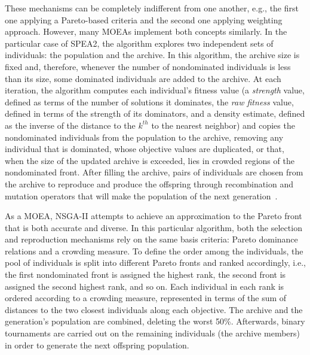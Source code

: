 	These mechanisms can be completely indifferent from one another, e.g., the first one applying a Pareto-based criteria and the second one applying weighting approach. However, many \acp{MOEA} implement both concepts similarly. In the particular case of \ac{SPEA2}, the algorithm explores two independent sets of individuals: the population and the archive. In this algorithm, the archive size is fixed and, therefore, whenever the number of nondominated individuals is less than its size, some dominated individuals are added to the archive. At each iteration, the algorithm computes each individual's fitness value (a \textit{strength} value, defined as terms of the number of solutions it dominates, the \textit{raw fitness} value, defined in terms of the strength of its dominators, and a density estimate, defined as the inverse of the distance to the $k^{th}$ to the nearest neighbor) and copies the nondominated individuals from the population to the archive, removing any individual that is dominated, whose objective values are duplicated, or that, when the size of the updated archive is exceeded, lies in crowded regions of the nondominated front. After filling the archive, pairs of individuals are chosen from the archive to reproduce and produce the offspring through recombination and mutation operators that will make the population of the next generation~\cite{Zitzler2001SPEA2}.
	
	As a \ac{MOEA}, \ac{NSGA-II} attempts to achieve an approximation to the Pareto front that is both accurate and diverse. In this particular algorithm, both the selection and reproduction mechanisms rely on the same basis criteria: Pareto dominance relations and a crowding measure. To define the order among the individuals, the pool of individuals is split into different Pareto fronts and ranked accordingly, i.e., the first nondominated front is assigned the highest rank, the second front is assigned the second highest rank, and so on. Each individual in each rank is ordered according to a crowding measure, represented in terms of the sum of distances to the two closest individuals along each objective. The archive and the generation's population are combined, deleting the worst 50\%. Afterwards, binary tournaments are carried out on the remaining individuals (the archive members) in order to generate the next offspring population.	
	
